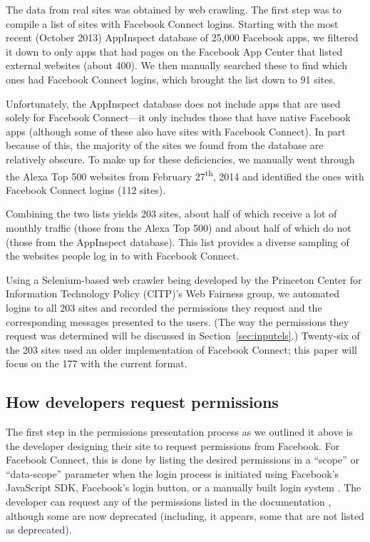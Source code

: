 \documentclass[10pt]{sig-alternate-10pt}
\begin{document}
The data from real sites was obtained by web crawling. The first step was to compile a list of sites with Facebook Connect logins. Starting with the most recent (October 2013) AppInspect \cite{appinspect} database of 25,000 Facebook apps, we filtered it down to only apps that had pages on the Facebook App Center that listed external websites (about 400). We then manually searched these to find which ones had Facebook Connect logins, which brought the list down to 91 sites.

Unfortunately, the AppInspect database does not include apps that are used solely for Facebook Connect---it only includes those that have native Facebook apps (although some of these also have sites with Facebook Connect). In part because of this, the majority of the sites we found from the database are relatively obscure. To make up for these deficiencies, we manually went through the Alexa Top 500 \cite{alexa} websites from February 27\textsuperscript{th}, 2014 and identified the ones with Facebook Connect logins (112 sites). 

Combining the two lists yields 203 sites, about half of which receive a lot of monthly traffic (those from the Alexa Top 500) and about half of which do not (those from the AppInspect database). This list provides a diverse sampling of the websites people log in to with Facebook Connect.

Using a Selenium-based web crawler being developed by the Princeton Center for Information Technology Policy (CITP)'s Web Fairness group, we automated logins to all 203 sites and recorded the permissions they request and the corresponding messages presented to the users. (The way the permissions they request was determined will be discussed in Section~\ref{sec:inputels}.) Twenty-six of the 203 sites used an older implementation of Facebook Connect; this paper will focus on the 177 with the current format.

\subsection{How developers request permissions}

The first step in the permissions presentation process as we outlined it above is the developer designing their site to request permissions from Facebook. For Facebook Connect, this is done by listing the desired permissions in a ``scope'' or ``data-scope'' parameter when the login process is initiated using Facebook's JavaScript SDK, Facebook's login button, or a manually built login system \cite{fbpermsinstructions}. The developer can request any of the permissions listed in the documentation \cite{fbpermissions}, although some are now deprecated (including, it appears, some that are not listed as deprecated).
\end{document}
